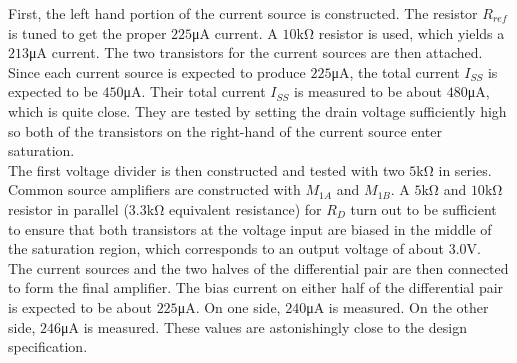 First, the left hand portion of the current source is constructed.
The resistor $R_{ref}$ is tuned to get the proper $225$\si{\micro\ampere} current.
A $10$\si{\kilo\ohm} resistor is used, which yields a $213$\si{\micro\ampere} current.
The two transistors for the current sources are then attached.
Since each current source is expected to produce $225$\si{\micro\ampere}, the total current $I_{SS}$ is expected to be $450$\si{\micro\ampere}.
Their total current $I_{SS}$ is measured to be about $480$\si{\micro\ampere}, which is quite close.
They are tested by setting the drain voltage sufficiently high so both of the transistors on the right-hand of the current source enter saturation. \\

The first voltage divider is then constructed and tested with two $5$\si{\kilo\ohm} in series.
Common source amplifiers are constructed with $M_{1A}$ and $M_{1B}$.
A $5$\si{\kilo\ohm} and $10$\si{\kilo\ohm} resistor in parallel ($3.3$\si{\kilo\ohm} equivalent resistance) for $R_D$ turn out to be sufficient to ensure that both transistors at the voltage input are biased in the middle of the saturation region, which corresponds to an output voltage of about $3.0$\si{\volt}. \\

The current sources and the two halves of the differential pair are then connected to form the final amplifier.
The bias current on either half of the differential pair is expected to be about $225$\si{\micro\ampere}.
On one side, $240$\si{\micro\ampere} is measured.
On the other side, $246$\si{\micro\ampere} is measured.
These values are astonishingly close to the design specification. \\

